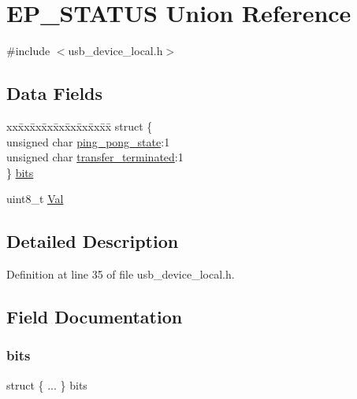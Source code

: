 \hypertarget{union_e_p___s_t_a_t_u_s}{}\section{E\+P\+\_\+\+S\+T\+A\+T\+US Union Reference}
\label{union_e_p___s_t_a_t_u_s}


{\ttfamily \#include $<$usb\+\_\+device\+\_\+local.\+h$>$}

\subsection*{Data Fields}
\begin{DoxyCompactItemize}
\item 
\begin{tabbing}
xx\=xx\=xx\=xx\=xx\=xx\=xx\=xx\=xx\=\kill
struct \{\\
\>unsigned char \mbox{\hyperlink{union_e_p___s_t_a_t_u_s_af0b1bd7b5767b174b8f055d94cac4bcc}{ping\_pong\_state}}:1\\
\>unsigned char \mbox{\hyperlink{union_e_p___s_t_a_t_u_s_a4a20792b6382277d34763fd0157c9f2e}{transfer\_terminated}}:1\\
\} \mbox{\hyperlink{union_e_p___s_t_a_t_u_s_a6fdf0ef83cc5b119e0ae322d471a4982}{bits}}\\

\end{tabbing}\item 
uint8\+\_\+t \mbox{\hyperlink{union_e_p___s_t_a_t_u_s_aa0c179f4462bb12ca1ed40d18c89cda1}{Val}}
\end{DoxyCompactItemize}


\subsection{Detailed Description}


Definition at line 35 of file usb\+\_\+device\+\_\+local.\+h.



\subsection{Field Documentation}
\mbox{\label{union_e_p___s_t_a_t_u_s_a6fdf0ef83cc5b119e0ae322d471a4982}} 
\subsubsection{\texorpdfstring{bits}{bits}}
{\footnotesize\ttfamily struct \{ ... \}   bits}

